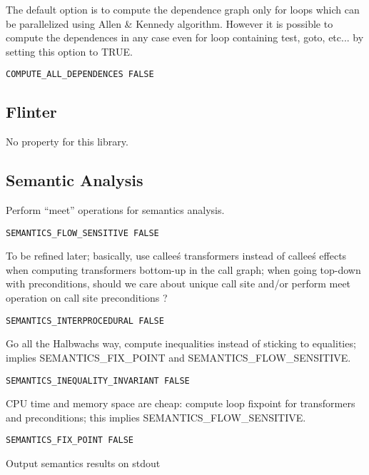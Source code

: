 The default option is to compute the dependence graph only for loops
which can be parallelized using Allen \& Kennedy algorithm.
However it is possible to
compute the dependences in any case even for loop containing test, goto,
etc...
by setting this option to TRUE.

\begin{verbatim}
COMPUTE_ALL_DEPENDENCES FALSE
\end{verbatim}

\subsection{Flinter}

No property for this library.

\subsection{Semantic Analysis}

Perform ``meet'' operations for semantics analysis.

\begin{verbatim}
SEMANTICS_FLOW_SENSITIVE FALSE
\end{verbatim}

To be refined later; basically, use callee\'s transformers instead of
callee\'s effects when computing transformers bottom-up in the call graph;
when going top-down with preconditions, should we care about unique
call site and/or perform meet operation on call site preconditions ?

\begin{verbatim}
SEMANTICS_INTERPROCEDURAL FALSE
\end{verbatim}

Go all the Halbwachs way, compute inequalities instead of sticking
to equalities; implies SEMANTICS\_FIX\_POINT and SEMANTICS\_FLOW\_SENSITIVE.

\begin{verbatim}
SEMANTICS_INEQUALITY_INVARIANT FALSE
\end{verbatim}

CPU time and memory space are cheap: compute loop fixpoint for
transformers and preconditions; this implies SEMANTICS\_FLOW\_SENSITIVE.

\begin{verbatim}
SEMANTICS_FIX_POINT FALSE
\end{verbatim}

Output semantics results on stdout

